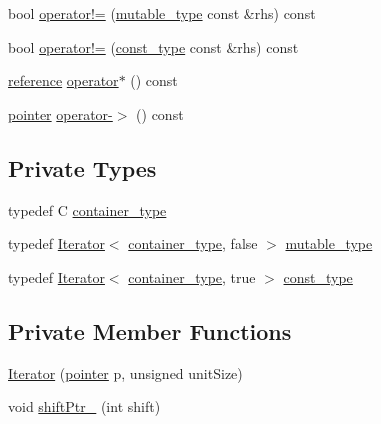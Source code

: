 \begin{DoxyCompactItemize}
\item 
bool \hyperlink{classpanda_1_1utils_1_1Iterator_a0d96dd11b07cd97aaccf304fb574d14b}{operator!=} (\hyperlink{classpanda_1_1utils_1_1Iterator}{mutable\_\-type} const \&rhs) const 
\item 
bool \hyperlink{classpanda_1_1utils_1_1Iterator_aaaa7b852e219a265c96ccd08a51071c7}{operator!=} (\hyperlink{classpanda_1_1utils_1_1Iterator}{const\_\-type} const \&rhs) const 
\item 
\hyperlink{classpanda_1_1utils_1_1Iterator_ac4ac97c60dc57aa24e36695240855a5c}{reference} \hyperlink{classpanda_1_1utils_1_1Iterator_a045fa30b7902d62bd9c70d48abe4abdc}{operator$\ast$} () const 
\item 
\hyperlink{classpanda_1_1utils_1_1Iterator_aad1c0f1ec4ce6fd567b46880b66769bf}{pointer} \hyperlink{classpanda_1_1utils_1_1Iterator_ae491214ded1d0a34ec3a4931da38a90e}{operator-\/$>$} () const 
\end{DoxyCompactItemize}
\subsection*{Private Types}
\begin{DoxyCompactItemize}
\item 
typedef C \hyperlink{classpanda_1_1utils_1_1Iterator_a11d51c3c28183fbf26ca5bd34e97d9cc}{container\_\-type}
\item 
typedef \hyperlink{classpanda_1_1utils_1_1Iterator}{Iterator}$<$ \hyperlink{classpanda_1_1utils_1_1Iterator_a11d51c3c28183fbf26ca5bd34e97d9cc}{container\_\-type}, false $>$ \hyperlink{classpanda_1_1utils_1_1Iterator_a05b47f8857b9a69c113cde13d0e1690c}{mutable\_\-type}
\item 
typedef \hyperlink{classpanda_1_1utils_1_1Iterator}{Iterator}$<$ \hyperlink{classpanda_1_1utils_1_1Iterator_a11d51c3c28183fbf26ca5bd34e97d9cc}{container\_\-type}, true $>$ \hyperlink{classpanda_1_1utils_1_1Iterator_a4b92948268861cb3f519cc9a4c46e4cb}{const\_\-type}
\end{DoxyCompactItemize}
\subsection*{Private Member Functions}
\begin{DoxyCompactItemize}
\item 
\hyperlink{classpanda_1_1utils_1_1Iterator_a713a9a1ab666137935393f709475a4a4}{Iterator} (\hyperlink{classpanda_1_1utils_1_1Iterator_aad1c0f1ec4ce6fd567b46880b66769bf}{pointer} p, unsigned unitSize)
\item 
void \hyperlink{classpanda_1_1utils_1_1Iterator_affba4c52306259cfae7010b896f2747c}{shiftPtr\_\-} (int shift)
\end{DoxyCompactItemize}

